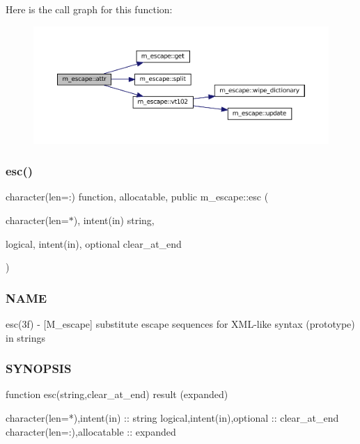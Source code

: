 Here is the call graph for this function\+:\nopagebreak
\begin{figure}[H]
\begin{center}
\leavevmode
\includegraphics[width=350pt]{namespacem__escape_ab9ee8dee0ee167567e9c2f570f398987_cgraph}
\end{center}
\end{figure}
\mbox{\label{namespacem__escape_a36f016baad6b23f86189e6f3ee6db0cb}} 
\subsubsection{\texorpdfstring{esc()}{esc()}}
{\footnotesize\ttfamily character(len=\+:) function, allocatable, public m\+\_\+escape\+::esc (\begin{DoxyParamCaption}\item[{character(len=$\ast$), intent(in)}]{string,  }\item[{logical, intent(in), optional}]{clear\+\_\+at\+\_\+end }\end{DoxyParamCaption})}



\subsubsection*{N\+A\+ME}

esc(3f) -\/ \mbox{[}M\+\_\+escape\mbox{]} substitute escape sequences for X\+M\+L-\/like syntax (prototype) in strings 

\subsubsection*{S\+Y\+N\+O\+P\+S\+IS}

\begin{DoxyVerb} function esc(string,clear_at_end) result (expanded)

   character(len=*),intent(in) :: string
   logical,intent(in),optional :: clear_at_end
   character(len=:),allocatable :: expanded
\end{DoxyVerb}


